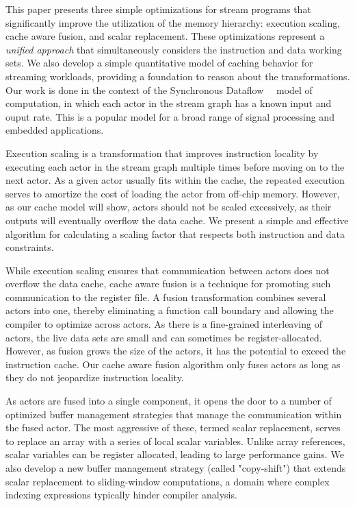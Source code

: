 This paper presents three simple optimizations for stream programs
that significantly improve the utilization of the memory hierarchy:
execution scaling, cache aware fusion, and scalar replacement.  These
optimizations represent a {\it unified approach} that simultaneously
considers the instruction and data working sets.  We also develop a
simple quantitative model of caching behavior for streaming workloads,
providing a foundation to reason about the transformations.  Our work
is done in the context of the Synchronous Dataflow~~\cite{LM87-i}
model of computation, in which each actor in the stream graph has a
known input and ouput rate.  This is a popular model for a broad range
of signal processing and embedded applications.

Execution scaling is a transformation that improves instruction
locality by executing each actor in the stream graph multiple times
before moving on to the next actor.  As a given actor usually fits
within the cache, the repeated execution serves to amortize the cost
of loading the actor from off-chip memory.  However, as our cache
model will show, actors should not be scaled excessively, as their
outputs will eventually overflow the data cache.  We present a simple
and effective algorithm for calculating a scaling factor that respects
both instruction and data constraints.

While execution scaling ensures that communication between actors does
not overflow the data cache, cache aware fusion is a technique for
promoting such communication to the register file.  A fusion
transformation combines several actors into one, thereby eliminating a
function call boundary and allowing the compiler to optimize across
actors.  As there is a fine-grained interleaving of actors, the live
data sets are small and can sometimes be register-allocated.  However,
as fusion grows the size of the actors, it has the potential to exceed
the instruction cache.  Our cache aware fusion algorithm only fuses
actors as long as they do not jeopardize instruction locality.

As actors are fused into a single component, it opens the door to a
number of optimized buffer management strategies that manage the
communication within the fused actor.  The most aggressive of these,
termed scalar replacement, serves to replace an array with a series of
local scalar variables.  Unlike array references, scalar variables can
be register allocated, leading to large performance gains.  We also
develop a new buffer management strategy (called "copy-shift") that
extends scalar replacement to sliding-window computations, a domain
where complex indexing expressions typically hinder compiler analysis.

